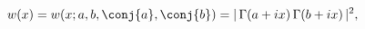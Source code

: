 \[w(x)=w(x;a,b,\conj{a},\conj{b})=|\mathop{\Gamma\/}\nolimits\!\left(a+ix\right)%
\mathop{\Gamma\/}\nolimits\!\left(b+ix\right)|^{2},\]